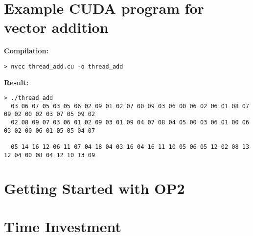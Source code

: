 
\appendixpage
\setcounter{section}{0}
\renewcommand{\thesection}{\Alph{section}}

\section{Example CUDA program for vector addition}
\label{app:cudaEx}

\vspace{-1em}
\begin{adjustwidth}{-.5in}{-.5in}
\textbf{Compilation:}
\begin{verbatim}
> nvcc thread_add.cu -o thread_add
\end{verbatim}
\textbf{Result:}
\begin{footnotesize}
\begin{verbatim}
> ./thread_add
  03 06 07 05 03 05 06 02 09 01 02 07 00 09 03 06 00 06 02 06 01 08 07 09 02 00 02 03 07 05 09 02
  02 08 09 07 03 06 01 02 09 03 01 09 04 07 08 04 05 00 03 06 01 00 06 03 02 00 06 01 05 05 04 07

  05 14 16 12 06 11 07 04 18 04 03 16 04 16 11 10 05 06 05 12 02 08 13 12 04 00 08 04 12 10 13 09
\end{verbatim}
\end{footnotesize}
\end{adjustwidth}
\section{Getting Started with OP2}
\label{app:getStart}

\section{Time Investment}
